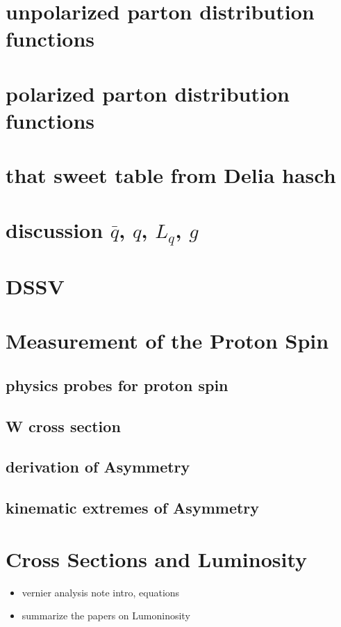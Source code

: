\section{ unpolarized parton distribution functions}
\section{ polarized parton distribution functions}
\section{ that sweet table from Delia hasch}
\section{ discussion $\bar{q}$, $q$, $L_q$, $g$}
\section{ DSSV }

\clearpage
\section{Measurement of the Proton Spin}
\subsection{ physics probes for proton spin}
\subsection{ W cross section}
\subsection{ derivation of Asymmetry}
\subsection{ kinematic extremes of Asymmetry}

\clearpage
\section{Cross Sections and Luminosity}
\begin{itemize}
		\item vernier analysis note intro, equations
		\item summarize the papers on Lumoninosity
\end{itemize}

\clearpage
